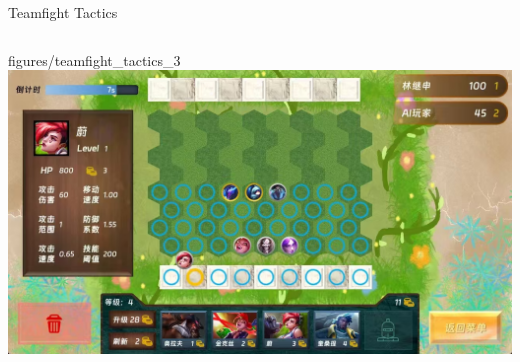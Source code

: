 \documentclass{beamer}
\begin{document}
\begin{frame}[fragile]{Teamfight Tactics}
\begin{columns}
\begin{column}{0.4\textwidth}
{figures/teamfight_tactics_3}
\includegraphics[width=\textwidth]
{figures/teamfight_tactics_4}
\end{column}
\end{columns}
\end{frame}

\end{document}
